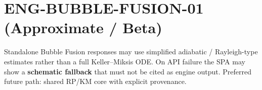 \documentclass{article}
\begin{document}
\section*{ENG-BUBBLE-FUSION-01 (Approximate / Beta)}
Standalone Bubble Fusion responses may use simplified adiabatic / Rayleigh-type
estimates rather than a full Keller--Miksis ODE. On API failure the SPA may show
a \textbf{schematic fallback} that must not be cited as engine output.
Preferred future path: shared RP/KM core with explicit provenance.
\end{document}

